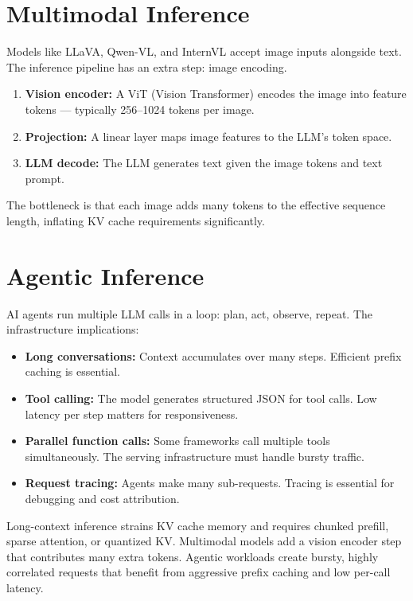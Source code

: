 \documentclass[10pt, oneside, openany]{book}
\newenvironment{chapsummary}
  {\begin{tcolorbox}[enhanced, breakable,
    colback={rgb,255:red,245;green,245;blue,225},
    colframe=AccentOrange, boxrule=1.5pt, arc=4pt,
    title={\bfseries Chapter Summary},
    fonttitle=\bfseries\color{white},
    attach boxed title to top left={yshift=-2mm, xshift=5mm},
    boxed title style={colback=AccentOrange, arc=2pt}]}
  {\end{tcolorbox}}
\begin{document}
\section{Multimodal Inference}

Models like LLaVA, Qwen-VL, and InternVL accept image inputs alongside text.
The inference pipeline has an extra step: image encoding.

\begin{enumerate}
  \item \textbf{Vision encoder:} A ViT (Vision Transformer) encodes the image
        into feature tokens --- typically 256--1024 tokens per image.
  \item \textbf{Projection:} A linear layer maps image features to the LLM's
        token space.
  \item \textbf{LLM decode:} The LLM generates text given the image tokens
        and text prompt.
\end{enumerate}

The bottleneck is that each image adds many tokens to the effective sequence
length, inflating KV cache requirements significantly.

\section{Agentic Inference}

AI agents run multiple LLM calls in a loop: plan, act, observe, repeat.
The infrastructure implications:

\begin{itemize}
  \item \textbf{Long conversations:} Context accumulates over many steps.
        Efficient prefix caching is essential.
  \item \textbf{Tool calling:} The model generates structured JSON for tool calls.
        Low latency per step matters for responsiveness.
  \item \textbf{Parallel function calls:} Some frameworks call multiple tools
        simultaneously.  The serving infrastructure must handle bursty traffic.
  \item \textbf{Request tracing:} Agents make many sub-requests.  Tracing is
        essential for debugging and cost attribution.
\end{itemize}

\begin{chapsummary}
Long-context inference strains KV cache memory and requires chunked prefill,
sparse attention, or quantized KV.  Multimodal models add a vision encoder step
that contributes many extra tokens.  Agentic workloads create bursty, highly
correlated requests that benefit from aggressive prefix caching and low per-call
latency.
\end{chapsummary}
\end{document}
